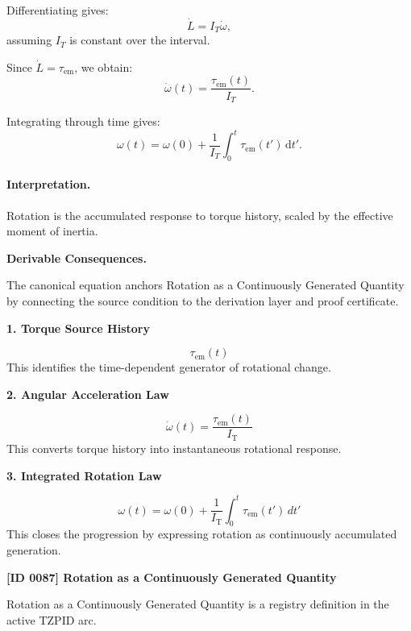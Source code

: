 Differentiating gives:
\begin{equation}
\dot{L}
=
I_T\dot{\omega},
\end{equation}
assuming $I_T$ is constant over the interval.

Since $\dot{L}=\tau_{\mathrm{em}}$, we obtain:
\begin{equation}
\dot{\omega}(t)
=
\frac{\tau_{\mathrm{em}}(t)}{I_T}.
\end{equation}

Integrating through time gives:
\begin{equation}
\boxed{
\omega(t)
=
\omega(0)
+
\frac{1}{I_T}
\int_0^t
\tau_{\mathrm{em}}(t')
\,\mathrm{d}t' .
}
\end{equation}

\paragraph{Interpretation.}
Rotation is the accumulated response to torque history, scaled by the effective moment of inertia.

\par\vspace{0.35em}
\noindent\textbf{Derivable Consequences.}\quad
\begingroup
\footnotesize
\raggedright
The canonical equation anchors Rotation as a Continuously Generated Quantity by connecting the source condition to the derivation layer and proof certificate.
\par\endgroup

\noindent\textbf{1. Torque Source History}\par
\[
\tau_{\mathrm{em}}(t)
\]
\noindent This identifies the time-dependent generator of rotational change.\par
\noindent\textbf{2. Angular Acceleration Law}\par
\[
\dot{\omega}(t)=\frac{\tau_{\mathrm{em}}(t)}{I_{\mathrm{T}}}
\]
\noindent This converts torque history into instantaneous rotational response.\par
\noindent\textbf{3. Integrated Rotation Law}\par
\[
\omega(t)=\omega(0)+\frac{1}{I_{\mathrm{T}}}\int_{0}^{t}\tau_{\mathrm{em}}(t')\,dt'
\]
\noindent This closes the progression by expressing rotation as continuously accumulated generation.\par

\clearpage
\noindent\textbf{[ID 0087] Rotation as a Continuously Generated Quantity}\par
\vspace{0.35em}
\begingroup\small
{}
Rotation as a Continuously Generated Quantity is a registry definition in the active TZPID arc.

